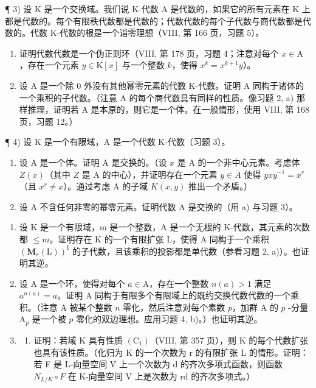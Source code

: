 ¶ 3) 设 K 是一个交换域。我们说 K-代数 A 是代数的，如果它的所有元素在 K 上都是代数的。每个有限秩代数都是代数的；代数代数的每个子代数与商代数都是代数的。代数 K-代数的根是一个诣零理想（VIII, 第 166 页，习题 5）。

\begin{enumerate}
\def\labelenumi{\alph{enumi})}
\item
  证明代数代数是一个伪正则环（VIII, 第 178 页，习题 4；注意对每个 \(x \in \mathrm{A}\)，存在一个元素 \(y \in \mathrm{K}[x]\) 与一个整数 \(k\)，使得 \(x^k = x^{k+1}y\)）。
\item
  设 A 是一个除 0 外没有其他幂零元素的代数 K-代数。证明 A 同构于诸体的一个乘积的子代数。（注意 A 的每个商代数具有同样的性质。像习题 2, a) 那样推理，证明若 A 是本原的，则它是一个体。在一般情形，使用 VIII, 第 168 页，习题 12。）
\end{enumerate}

¶ 4) 设 K 是一个有限域，A 是一个代数 K-代数（习题 3）。

\begin{enumerate}
\def\labelenumi{\alph{enumi})}
\item
  设 A 是一个体。证明 A 是交换的。（设 \(x\) 是 A 的一个非中心元素。考虑体 \(Z(x)\)（其中 \(Z\) 是 A 的中心），并证明存在一个元素 \(y \in A\) 使得 \(yxy^{-1} = x^r\)（且 \(x^r \neq x\)）。通过考虑 A 的子域 \(K(x,y)\) 推出一个矛盾。）
\item
  设 A 不含任何非零的幂零元素。证明代数 A 是交换的（用 a) 与习题 3）。
\end{enumerate}

\begin{enumerate}
\def\labelenumi{\arabic{enumi})}
\setcounter{enumi}{4}
\item
  设 K 是一个有限域，m 是一个整数，A 是一个无根的 K-代数，其元素的次数都 \(\leqslant m\)。证明存在 K 的一个有限扩张 L，使得 A 同构于一个乘积 \((\mathbf{M}_{r}(\mathrm{L}))^{\mathrm{I}}\) 的子代数，且该乘积的投影都是单代数（参看习题 2, a)）。也证明其逆。
\item
  设 A 是一个环，使得对每个 \(a \in \mathrm{A}\)，存在一个整数 \(n(a) > 1\) 满足 \(a^{n(a)} = a\)。证明 A 同构于有限多个有限域上的既约交换代数代数的一个乘积。（注意 A 被某个整数 \(n\) 零化，然后注意对每个素数 \(p\)，加群 A 的 \(p\) -分量 \(\mathrm{A}_p\) 是一个被 \(p\) 零化的双边理想。应用习题 4, b)。）也证明其逆。
\item
  \begin{enumerate}
  \def\labelenumii{\alph{enumii})}
  \tightlist
  \item
    证明：若域 K 具有性质 \((\mathrm{C}_{1})\)（VIII, 第 357 页），则 K 的每个代数扩张也具有该性质。（化归为 K 的一个次数为 r 的有限扩张 L 的情形。证明：若 F 是 L-向量空间 V 上一个次数为 d 的齐次多项式函数，则函数 \(N_{L/K} \circ F\) 在 K-向量空间 V 上是次数为 rd 的齐次多项式。）
  \end{enumerate}
\end{enumerate}

